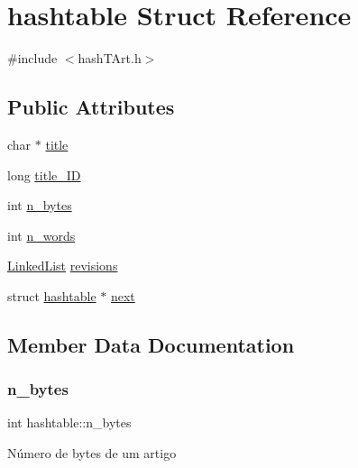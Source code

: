\hypertarget{structhashtable}{}\section{hashtable Struct Reference}
\label{structhashtable}


{\ttfamily \#include $<$hash\+T\+Art.\+h$>$}

\subsection*{Public Attributes}
\begin{DoxyCompactItemize}
\item 
char $\ast$ \hyperlink{structhashtable_af8873f3f188208e38b53e7e2e6300dd8}{title}
\item 
long \hyperlink{structhashtable_ad7b7b127285f3ca33a30124b71a9c948}{title\+\_\+\+ID}
\item 
int \hyperlink{structhashtable_a199ce0464f44765fd8704d213633ba92}{n\+\_\+bytes}
\item 
int \hyperlink{structhashtable_a78bdab228567b612382b8ef96933d6ff}{n\+\_\+words}
\item 
\hyperlink{linkedList_8h_a2266b5434491632a8342c9f636f413c6}{Linked\+List} \hyperlink{structhashtable_ad58d9069aadeb6d75f42b0132febc1f0}{revisions}
\item 
struct \hyperlink{structhashtable}{hashtable} $\ast$ \hyperlink{structhashtable_a593bc32e958ac3edc1d4a206e22deaae}{next}
\end{DoxyCompactItemize}


\subsection{Member Data Documentation}
\mbox{\label{structhashtable_a199ce0464f44765fd8704d213633ba92}} 
\subsubsection{\texorpdfstring{n\+\_\+bytes}{n\_bytes}}
{\footnotesize\ttfamily int hashtable\+::n\+\_\+bytes}

Número de bytes de um artigo \mbox{\label{structhashtable_a78bdab228567b612382b8ef96933d6ff}} 

